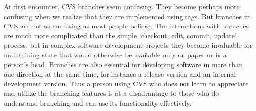 \documentclass[12pt,letterpaper]{article}
\begin{document}
At first encounter, CVS branches seem confusing.  They become perhaps more
confusing when we realize that they are implemented using tags.  But branches
in CVS are not as confusing as most people believe.  The interactions with
branches are much more complicated than the simple `checkout, edit, commit,
update' process, but in complex software development projects they become
invaluable for maintaining state that would otherwise be available only on
paper or in a person's head.  Branches are also essential for developing
software in more than one direction at the same time, for instance a release
version and an internal development version.  Thus a person using CVS who does
not learn to appreciate and utilize the branching features is at a
disadvantage to those who do understand branching and can use its
functionality effectively.


\end{document}
